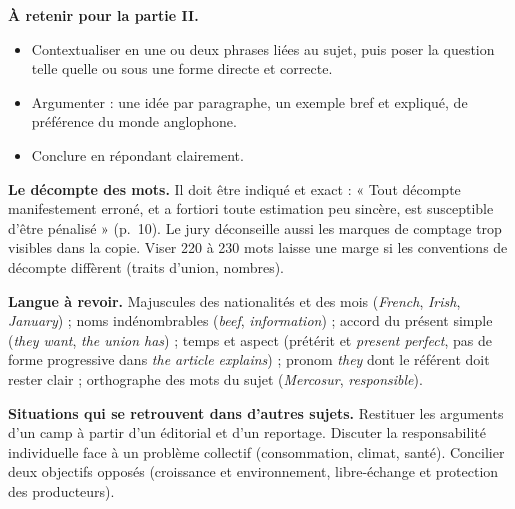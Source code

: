\documentclass[11pt,a4paper]{article}
\providecommand{\tightlist}{\setlength{\itemsep}{0pt}\setlength{\parskip}{0pt}}
\begin{document}
\textbf{À retenir pour la partie II.}

\begin{itemize}
\tightlist
\item
  Contextualiser en une ou deux phrases liées au sujet, puis poser la question telle quelle ou sous une forme directe et correcte.
\item
  Argumenter : une idée par paragraphe, un exemple bref et expliqué, de préférence du monde anglophone.
\item
  Conclure en répondant clairement.
\end{itemize}

\textbf{Le décompte des mots.} Il doit être indiqué et exact : « Tout décompte manifestement erroné, et a fortiori toute estimation peu sincère, est susceptible d'être pénalisé » (p.~10). Le jury déconseille aussi les marques de comptage trop visibles dans la copie. Viser 220 à 230 mots laisse une marge si les conventions de décompte diffèrent (traits d'union, nombres).

\textbf{Langue à revoir.} Majuscules des nationalités et des mois (\emph{French}, \emph{Irish}, \emph{January}) ; noms indénombrables (\emph{beef}, \emph{information}) ; accord du présent simple (\emph{they want}, \emph{the union has}) ; temps et aspect (prétérit et \emph{present perfect}, pas de forme progressive dans \emph{the article explains}) ; pronom \emph{they} dont le référent doit rester clair ; orthographe des mots du sujet (\emph{Mercosur}, \emph{responsible}).

\textbf{Situations qui se retrouvent dans d'autres sujets.} Restituer les arguments d'un camp à partir d'un éditorial et d'un reportage. Discuter la responsabilité individuelle face à un problème collectif (consommation, climat, santé). Concilier deux objectifs opposés (croissance et environnement, libre-échange et protection des producteurs).
\end{document}
